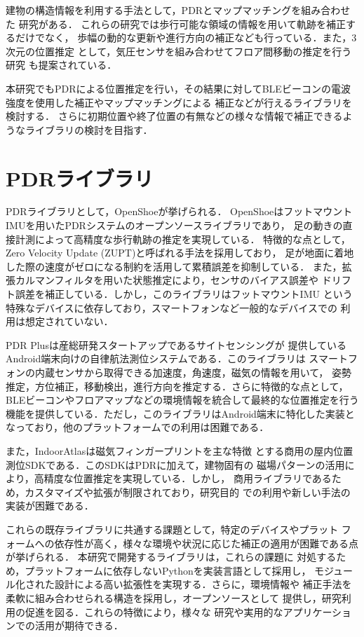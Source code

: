 建物の構造情報を利用する手法として，PDRとマップマッチングを組み合わせた
研究\cite{pdr-map}がある．
これらの研究では歩行可能な領域の情報を用いて軌跡を補正するだけでなく，
歩幅の動的な更新や進行方向の補正なども行っている．また，3次元の位置推定
として，気圧センサを組み合わせてフロア間移動の推定を行う研究\cite{pdr-wifi}\cite{pdr-stable}
も提案されている．

本研究でもPDRによる位置推定を行い，その結果に対してBLEビーコンの電波強度を使用した補正やマップマッチングによる
補正などが行えるライブラリを検討する．
さらに初期位置や終了位置の有無などの様々な情報で補正できるようなライブラリの検討を目指す．


\section{PDRライブラリ}

PDRライブラリとして，OpenShoe\cite{openshoe}が挙げられる．
OpenShoeはフットマウントIMUを用いたPDRシステムのオープンソースライブラリであり，
足の動きの直接計測によって高精度な歩行軌跡の推定を実現している．
特徴的な点として，Zero Velocity Update (ZUPT)と呼ばれる手法を採用しており，
足が地面に着地した際の速度がゼロになる制約を活用して累積誤差を抑制している．
また，拡張カルマンフィルタを用いた状態推定により，センサのバイアス誤差や
ドリフト誤差を補正している．しかし，このライブラリはフットマウントIMU
という特殊なデバイスに依存しており，スマートフォンなど一般的なデバイスでの
利用は想定されていない．

PDR Plus\cite{pdr-plus}は産総研発スタートアップであるサイトセンシングが
提供しているAndroid端末向けの自律航法測位システムである．このライブラリは
スマートフォンの内蔵センサから取得できる加速度，角速度，磁気の情報を用いて，
姿勢推定，方位補正，移動検出，進行方向を推定する．さらに特徴的な点として，
BLEビーコンやフロアマップなどの環境情報を統合して最終的な位置推定を行う
機能を提供している．ただし，このライブラリはAndroid端末に特化した実装と
なっており，他のプラットフォームでの利用は困難である．

また，IndoorAtlas\cite{indoor-atlas}は磁気フィンガープリントを主な特徴
とする商用の屋内位置測位SDKである．このSDKはPDRに加えて，建物固有の
磁場パターンの活用により，高精度な位置推定を実現している．しかし，
商用ライブラリであるため，カスタマイズや拡張が制限されており，研究目的
での利用や新しい手法の実装が困難である．

これらの既存ライブラリに共通する課題として，特定のデバイスやプラット
フォームへの依存性が高く，様々な環境や状況に応じた補正の適用が困難である点が挙げられる．
本研究で開発するライブラリは，これらの課題に
対処するため，プラットフォームに依存しないPythonを実装言語として採用し，
モジュール化された設計による高い拡張性を実現する．さらに，環境情報や
補正手法を柔軟に組み合わせられる構造を採用し，オープンソースとして
提供し，研究利用の促進を図る．これらの特徴により，様々な
研究や実用的なアプリケーションでの活用が期待できる．




